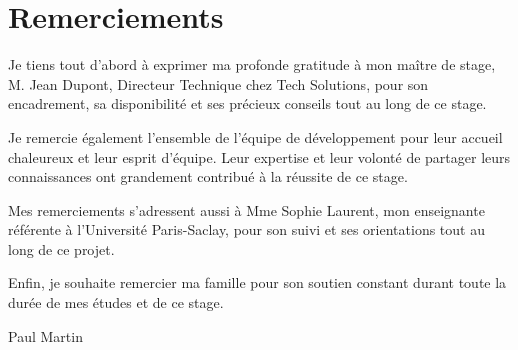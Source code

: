 \chapter*{Remerciements}

Je tiens tout d'abord à exprimer ma profonde gratitude à mon maître de stage, M. Jean Dupont, Directeur Technique chez Tech Solutions, pour son encadrement, sa disponibilité et ses précieux conseils tout au long de ce stage.

Je remercie également l'ensemble de l'équipe de développement pour leur accueil chaleureux et leur esprit d'équipe. Leur expertise et leur volonté de partager leurs connaissances ont grandement contribué à la réussite de ce stage.

Mes remerciements s'adressent aussi à Mme Sophie Laurent, mon enseignante référente à l'Université Paris-Saclay, pour son suivi et ses orientations tout au long de ce projet.

Enfin, je souhaite remercier ma famille pour son soutien constant durant toute la durée de mes études et de ce stage.

\vspace{2cm}

\begin{flushright}
	Paul Martin
\end{flushright}